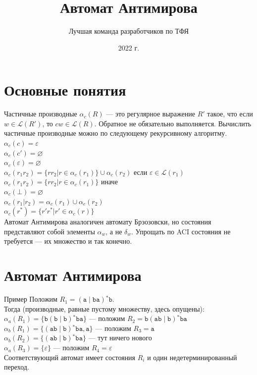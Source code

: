 \documentclass[mathserif]{beamer}
\title[] {Автомат Антимирова}
\author[Chipollino]{Лучшая команда разработчиков по ТФЯ} %
\date[] 
{2022 г.}
\newcommand{\Lang}{\mathscr{L}} %
\def\alter{\ensuremath{\mathrel{\vert}}}%
\def\star{\ensuremath{^{*}}}%
\def\regexpstr#1{\mathtt{#1}}%
\newcommand{\empt}{\varepsilon} %
\begin{document}
\maketitle
\section{Основные понятия}
\begin{frame}{Частичные производные}
    $\alpha_{c}(R)$ — это регулярное выражение $R'$ такое, что если $w \in \Lang(R')$, то $cw \in \Lang(R)$. Обратное не обязательно выполняется. Вычислить частичные производные можно по следующему рекурсивному алгоритму.\\
    $\alpha_{c}(c) = {\empt}$\\
    $\alpha_{c}(c') = \varnothing$\\
    $\alpha_{c}(\empt) = \varnothing$\\
    $\alpha_{c}(r_{1} r_{2}) = \{r r_{2} | r \in \alpha_{c}(r_{1})\} \cup \alpha_{c}(r_{2})$ если $\empt \in \Lang(r_{1})$\\
    $\alpha_{c}(r_{1} r_{2}) = \{r r_{2} | r \in \alpha_{c}(r_{1})\}$ иначе\\
    $\alpha_{c}(\bot) = \varnothing$\\
    $\alpha_{c}(r_{1}|r_{2}) = \alpha_{c}(r_{1}) \cup \alpha_{c}(r_{2})$\\
    $\alpha_{c}(r\star) = \{r'r\star | r' \in \alpha_{c}(r)\}$\\
    Автомат Антимирова аналогичен автомату Брзозовски, но состояния представляют собой элементы $\alpha_{w}$, а не $\delta_{w}$. Упрощать по ACI состояния не требуется — их множество и так конечно.
\end{frame}

\section{Автомат Антимирова}
\begin{frame}{Пример}
    Положим $R_{1} = (\regexpstr{a} \alter \regexpstr{ba})\star \regexpstr{b}$.\\
    Тогда (производные, равные пустому множеству, здесь опущены):\\
    $\alpha_{a}(R_{1}) = \{\regexpstr{b(b\alter b)}\star\regexpstr{ba}\}$ — положим $R_{2} = \regexpstr{b(ab\alter b)}\star\regexpstr{ba}$\\
    $\alpha_{b}(R_{1}) = \{\regexpstr{(ab\alter b)}\star\regexpstr{ba}, \regexpstr{a}\}$ — положим $R_{3} = \regexpstr{a}$\\
    $\alpha_{b}(R_{2}) = \{\regexpstr{(ab\alter b)}\star \regexpstr{ba}\}$ — тут ничего нового\\
    $\alpha_{a}(R_{3}) = \{\empt\}$ — положим $R_{4} = \empt$\\
    Соответствующий автомат имеет состояния $R_{i}$ и один недетерминированный переход.
\end{frame}%
\end{document}
